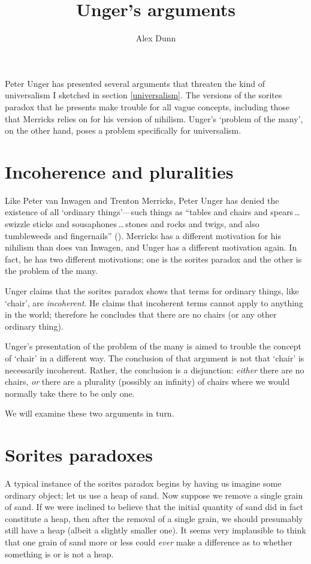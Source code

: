 \documentclass[11pt]{article}
\title{Unger's arguments}
\author{Alex Dunn}
\begin{document}
\ifstandalone
\maketitle
\begin{spacing}{1.5}
\fi

Peter Unger has presented several arguments that threaten the kind of
universalism I sketched in section \ref{universalism}.  The versions
of the sorites paradox that he presents make trouble for all vague
concepts, including those that Merricks relies on for his version of
nihilism.  Unger's `problem of the many', on the other hand, poses a
problem specifically for universalism.

\section{Incoherence and pluralities}
\label{unger}
Like Peter van Inwagen and Trenton Merricks, Peter Unger has denied
the existence of all `ordinary things'---such things as ``tables and
chairs and spears\,\ldots swizzle sticks and
sousaphones\,\ldots\,stones and rocks and twigs, and also tumbleweeds
and fingernails'' (\citeyear[117]{unger1979}).  Merricks has a
different motivation for his nihilism than does van Inwagen, and Unger
has a different motivation again.  In fact, he has two different
motivations; one is the sorites paradox and the other is the problem
of the many.  

Unger claims that the sorites paradox shows that terms for ordinary
things, like `chair', are {\em incoherent}.  He claims that incoherent
terms cannot apply to anything in the world; therefore he concludes
that there are no chairs (or any other ordinary thing).

Unger's presentation of the problem of the many is aimed to trouble
the concept of `chair' in a different way.  The conclusion of that
argument is not that `chair' is necessarily incoherent.  Rather, the
conclusion is a disjunction: {\em either} there are no chairs, {\em
  or} there are a plurality (possibly an infinity) of chairs where we
would normally take there to be only one.

We will examine these two arguments in turn.

\section{Sorites paradoxes}
\label{sorites}
A typical instance of the sorites paradox begins by having us imagine
some ordinary object; let us use a heap of sand.  Now suppose we
remove a single grain of sand.  If we were inclined to believe that
the initial quantity of sand did in fact constitute a heap, then after
the removal of a single grain, we should presumably still have a heap
(albeit a slightly smaller one).  It seems very implausible to think
that one grain of sand more or less could {\em ever} make a difference
as to whether something is or is not a heap.


\end{spacing}
\end{document}

